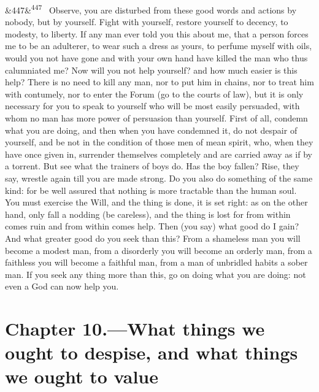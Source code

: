 \documentclass[12pt]{article}
\newcommand{\para}[1][]{\par\noindent\ifx&#1&\else\textsuperscript{\footnotesize #1}~\fi}
\begin{document}
\para[447] Observe, you are disturbed from these good words and actions by nobody, but by yourself. Fight with yourself, restore yourself to decency, to modesty, to liberty. If any man ever told you this about me, that a person forces me to be an adulterer, to wear such a dress as yours, to perfume myself with oils, would you not have gone and with your own hand have killed the man who thus calumniated me? Now will you not help yourself? and how much easier is this help? There is no need to kill any man, nor to put him in chains, nor to treat him with contumely, nor to enter the Forum (go to the courts of law), but it is only necessary for you to speak to yourself who will be most easily persuaded, with whom no man has more power of persuasion than yourself. First of all, condemn what you are doing, and then when you have condemned it, do not despair of yourself, and be not in the condition of those men of mean spirit, who, when they have once given in, surrender themselves completely and are carried away as if by a torrent. But see what the trainers of boys do. Has the boy fallen? Rise, they say, wrestle again till you are made strong. Do you also do something of the same kind: for be well assured that nothing is more tractable than the human soul. You must exercise the Will, and the thing is done, it is set right: as on the other hand, only fall a nodding (be careless), and the thing is lost for from within comes ruin and from within comes help. Then (you say) what good do I gain? And what greater good do you seek than this? From a shameless man you will become a modest man, from a disorderly you will become an orderly man, from a faithless you will become a faithful man, from a man of unbridled habits a sober man. If you seek any thing more than this, go on doing what you are doing: not even a God can now help you.

\section*{Chapter 10.---What things we ought to despise, and what things we ought to value}
\end{document}

